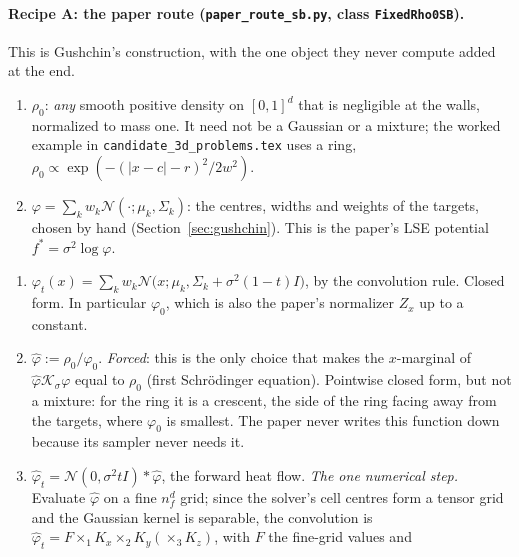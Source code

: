\documentclass[11pt]{article}
\newcommand{\code}[1]{\texttt{#1}}
\newcommand{\Nc}{\mathcal{N}}
\newcommand{\Kc}{\mathcal{K}}
\newcommand{\hphi}{\hat\varphi}
\theoremstyle{definition}
\theoremstyle{plain}
\begin{document}
\paragraph{Recipe A: the paper route (\code{paper\_route\_sb.py}, class \code{FixedRho0SB}).}
This is Gushchin's construction, with the one object they never compute added at the end.
\begin{description}[leftmargin=1.5em,itemsep=2pt]
  \item[We fix two things.]
    \begin{enumerate}[itemsep=1pt]
      \item $\rho_0$: \emph{any} smooth positive density on $[0,1]^d$ that is negligible at the
            walls, normalized to mass one. It need not be a Gaussian or a mixture; the worked
            example in \code{candidate\_3d\_problems.tex} uses a ring,
            $\rho_0\propto\exp(-(|x-c|-r)^2/2w^2)$.
      \item $\varphi=\sum_kw_k\Nc(\cdot;\mu_k,\Sigma_k)$: the centres, widths and weights of
            the targets, chosen by hand (Section~\ref{sec:gushchin}). This is the paper's
            LSE potential $f^*=\sigma^2\log\varphi$.
    \end{enumerate}
  \item[Everything else is derived, in this order.]
    \begin{enumerate}[itemsep=1pt]
      \item $\varphi_t(x)=\sum_kw_k\Nc\big(x;\mu_k,\Sigma_k+\sigma^2(1-t)I\big)$, by the
            convolution rule. Closed form. In particular $\varphi_0$, which is also the paper's
            normalizer $Z_x$ up to a constant.
      \item $\hphi:=\rho_0/\varphi_0$. \emph{Forced}: this is the only choice that makes the
            $x$-marginal of $\hphi\Kc_\sigma\varphi$ equal to $\rho_0$ (first Schr\"odinger
            equation). Pointwise closed form, but not a mixture: for the ring it is a crescent,
            the side of the ring facing away from the targets, where $\varphi_0$ is smallest.
            The paper never writes this function down because its sampler never needs it.
      \item $\hphi_t=\Nc(0,\sigma^2tI)*\hphi$, the forward heat flow. \emph{The one numerical
            step.} Evaluate $\hphi$ on a fine $n_f^d$ grid; since the solver's cell centres form
            a tensor grid and the Gaussian kernel is separable, the convolution is
            $\hphi_t=F\times_1K_x\times_2K_y(\times_3K_z)$, with $F$ the fine-grid values and

\end{enumerate}
\end{description}
\end{document}

